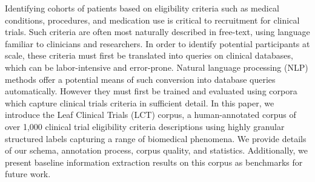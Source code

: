 \documentclass[../main.tex]{subfiles}
\begin{document}
\noindent
Identifying cohorts of patients based on eligibility criteria such as medical conditions, procedures, and medication use is critical to recruitment for clinical trials. Such criteria are often most naturally described in free-text, using language familiar to clinicians and researchers. In order to identify potential participants at scale, these criteria must first be translated into queries on clinical databases, which can be labor-intensive and error-prone. Natural language processing (NLP) methods offer a potential means of such conversion into database queries automatically. However they must first be trained and evaluated using corpora which capture clinical trials criteria in sufficient detail. In this paper, we introduce the Leaf Clinical Trials (LCT) corpus, a human-annotated corpus of over 1,000 clinical trial eligibility criteria descriptions using highly granular structured labels capturing a range of biomedical phenomena. We provide details of our schema, annotation process, corpus quality, and statistics. Additionally, we present baseline information extraction results on this corpus as benchmarks for future work.
\end{document}
